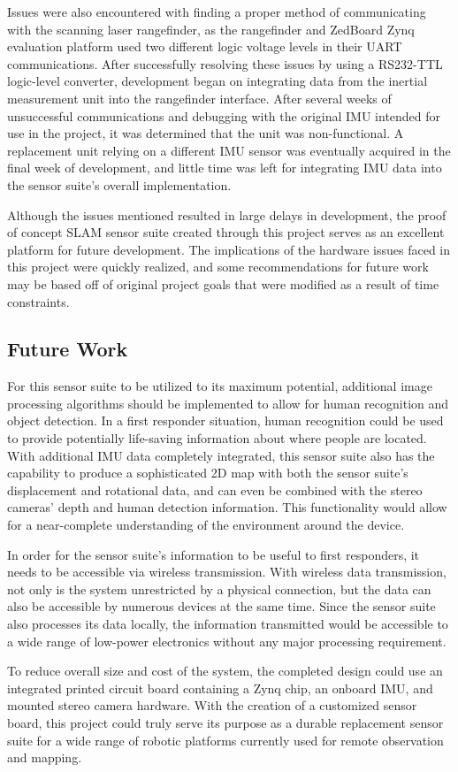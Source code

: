 \par
Issues were also encountered with finding a proper method of communicating with the scanning laser rangefinder, as the rangefinder and ZedBoard Zynq evaluation platform used two different logic voltage levels in their UART communications.  After successfully resolving these issues by using a RS232-TTL logic-level converter, development began on integrating data from the inertial measurement unit into the rangefinder interface. After several weeks of unsuccessful communications and debugging with the original IMU intended for use in the project, it was determined that the unit was non-functional. A replacement unit relying on a different IMU sensor was eventually acquired in the final week of development, and little time was left for integrating IMU data into the sensor suite's overall implementation.
\par
Although the issues mentioned resulted in large delays in development, the proof of concept SLAM sensor suite created through this project serves as an excellent platform for future development. The implications of the hardware issues faced in this project were quickly realized, and some recommendations for future work may be based off of original project goals that were modified as a result of time constraints.

\subsection{Future Work}
For this sensor suite to be utilized to its maximum potential, additional image processing algorithms should be implemented to allow for human recognition and object detection. In a first responder situation, human recognition could be used to provide potentially life-saving information about where people are located. With additional IMU data completely integrated, this sensor suite also has the capability to produce a sophisticated 2D map with both the sensor suite's displacement and rotational data, and can even be combined with the stereo cameras' depth and human detection information. This functionality would allow for a near-complete understanding of the environment around the device.
\par
In order for the sensor suite's information to be useful to first responders, it needs to be accessible via wireless transmission. With wireless data transmission, not only is the system unrestricted by a physical connection, but the data can also be accessible by numerous devices at the same time. Since the sensor suite also processes its data locally, the information transmitted would be accessible to a wide range of low-power electronics without any major processing requirement.
\par
To reduce overall size and cost of the system, the completed design could use an integrated printed circuit board containing a Zynq chip, an onboard IMU, and mounted stereo camera hardware. With the creation of a customized sensor board, this project could truly serve its purpose as a durable replacement sensor suite for a wide range of robotic platforms currently used for remote observation and mapping. 




